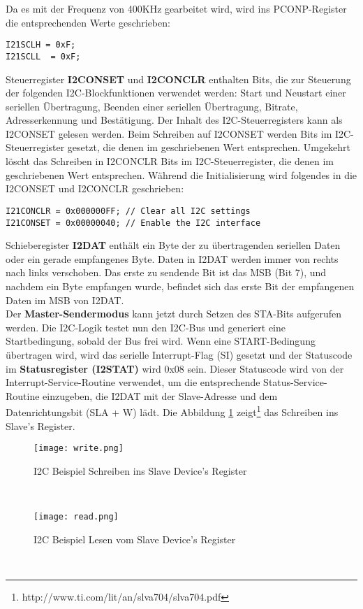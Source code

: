 Da es mit der Frequenz von 400KHz gearbeitet wird, wird ins PCONP-Register die entsprechenden Werte geschrieben:
\begin{lstlisting}
I21SCLH = 0xF;
I21SCLL  = 0xF;
\end{lstlisting}

Steuerregister \textbf{I2CONSET} und \textbf{I2CONCLR} enthalten Bits, die zur Steuerung der folgenden I2C-Blockfunktionen verwendet werden: Start und Neustart einer seriellen Übertragung, Beenden einer seriellen Übertragung, Bitrate, Adresserkennung und Bestätigung. Der Inhalt des I2C-Steuerregisters kann als I2CONSET gelesen werden. Beim Schreiben auf I2CONSET werden Bits im I2C-Steuerregister gesetzt, die denen im geschriebenen Wert entsprechen. Umgekehrt löscht das Schreiben in I2CONCLR Bits im I2C-Steuerregister, die denen im geschriebenen Wert entsprechen. Während die Initialisierung wird folgendes in die I2CONSET und I2CONCLR geschrieben: \\

\begin{lstlisting}
I21CONCLR = 0x000000FF; // Clear all I2C settings
I21CONSET = 0x00000040; // Enable the I2C interface
\end{lstlisting}

Schieberegister \textbf{I2DAT} enthält ein Byte der zu übertragenden seriellen Daten oder ein gerade empfangenes Byte. Daten in I2DAT werden immer von rechts nach links verschoben. Das erste zu sendende Bit ist das MSB (Bit 7), und nachdem ein Byte empfangen wurde, befindet sich das erste Bit der empfangenen Daten im MSB von I2DAT. \\

Der \textbf{Master-Sendermodus} kann jetzt durch Setzen des STA-Bits aufgerufen werden. Die I2C-Logik testet nun den I2C-Bus und generiert eine Startbedingung, sobald der Bus frei wird. Wenn eine START-Bedingung übertragen wird, wird das serielle Interrupt-Flag (SI) gesetzt und der Statuscode im \textbf{Statusregister (I2STAT)} wird 0x08 sein. Dieser Statuscode wird von der Interrupt-Service-Routine verwendet, um die entsprechende Status-Service-Routine einzugeben, die I2DAT mit der Slave-Adresse und dem Datenrichtungsbit (SLA + W) lädt. Die Abbildung \ref{fig:write} zeigt\footnote{http://www.ti.com/lit/an/slva704/slva704.pdf} das Schreiben ins Slave's Register.\\
\begin{figure}[!hb]
	\centering
	\texttt{[image: write.png]}
	\caption[I2C Beispiel Schreiben ins Slave Device's Register]{I2C Beispiel Schreiben ins Slave Device's Register}
	\label{fig:write}
\end{figure}\\
\begin{figure}[!hb]
	\centering
	\texttt{[image: read.png]}
	\caption[I2C Beispiel Lesen vom Slave Device's Register]{I2C Beispiel Lesen vom Slave Device's Register}
	\label{fig:read}
\end{figure}\\

